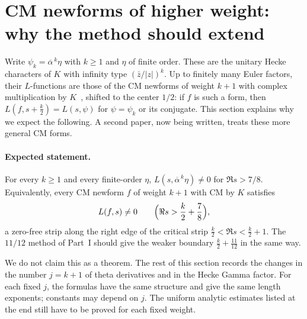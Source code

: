 \documentclass[11pt]{article}
\numberwithin{equation}{section}
\begin{document}
\section{CM newforms of higher weight: why the method should extend}\label{sec:higherweight}

Write $\psi_k=\overline\alpha^{\,k}\eta$ with $k\ge1$ and $\eta$ of finite order. These are the unitary Hecke
characters of $K$ with infinity type $(\bar z/|z|)^k$. Up to finitely many Euler factors, their
$L$-functions are those of the CM newforms of weight $k+1$ with complex multiplication by $K$~\cite{Shimura71,Ribet77}, shifted
to the center $1/2$: if $f$ is such a form, then $L(f,s+\frac k2)=L(s,\psi)$ for $\psi=\psi_k$ or its
conjugate. This section explains why we expect the following. A second paper, now being written, treats
these more general CM forms.

\paragraph{Expected statement.} For every $k\ge1$ and every finite-order $\eta$, $L(s,\overline\alpha^{\,k}\eta)\ne0$ for
$\Re s>7/8$. Equivalently, every CM newform $f$ of weight $k+1$ with CM by $K$ satisfies
\begin{equation}\label{eq:d087}
 L(f,s)\ne0\qquad\Bigl(\Re s>\frac k2+\frac78\Bigr),
\end{equation}
a zero-free strip along the right edge of the critical strip $\frac k2<\Re s<\frac k2+1$. The $11/12$
method of Part~I should give the weaker boundary $\frac k2+\frac{11}{12}$ in the same way.

We do not claim this as a theorem. The rest of this section records the changes in the number
$j=k+1$ of theta derivatives and in the Hecke Gamma factor. For each fixed $j$, the formulas have
the same structure and give the same length exponents; constants may depend on $j$.
The uniform analytic estimates listed at the end still have to be proved for each fixed weight.
\end{document}
